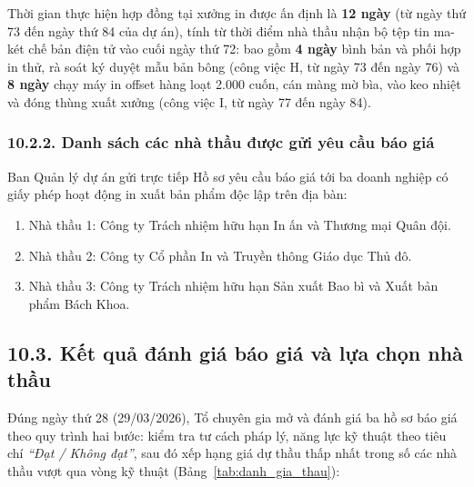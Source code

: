 Thời gian thực hiện hợp đồng tại xưởng in được ấn định là \textbf{12 ngày} (từ ngày thứ 73 đến ngày thứ 84 của dự án), tính từ thời điểm nhà thầu nhận bộ tệp tin ma-két chế bản điện tử vào cuối ngày thứ 72: bao gồm \textbf{4 ngày} bình bản và phối hợp in thử, rà soát ký duyệt mẫu bản bông (công việc H, từ ngày 73 đến ngày 76) và \textbf{8 ngày} chạy máy in offset hàng loạt 2.000 cuốn, cán màng mờ bìa, vào keo nhiệt và đóng thùng xuất xưởng (công việc I, từ ngày 77 đến ngày 84).

\subsubsection{10.2.2. Danh sách các nhà thầu được gửi yêu cầu báo giá}

Ban Quản lý dự án gửi trực tiếp Hồ sơ yêu cầu báo giá tới ba doanh nghiệp có giấy phép hoạt động in xuất bản phẩm độc lập trên địa bàn:
\begin{enumerate}
    \item Nhà thầu 1: Công ty Trách nhiệm hữu hạn In ấn và Thương mại Quân đội.
    \item Nhà thầu 2: Công ty Cổ phần In và Truyền thông Giáo dục Thủ đô.
    \item Nhà thầu 3: Công ty Trách nhiệm hữu hạn Sản xuất Bao bì và Xuất bản phẩm Bách Khoa.
\end{enumerate}

\subsection{10.3. Kết quả đánh giá báo giá và lựa chọn nhà thầu}

Đúng ngày thứ 28 (29/03/2026), Tổ chuyên gia mở và đánh giá ba hồ sơ báo giá theo quy trình hai bước: kiểm tra tư cách pháp lý, năng lực kỹ thuật theo tiêu chí \textit{``Đạt / Không đạt''}, sau đó xếp hạng giá dự thầu thấp nhất trong số các nhà thầu vượt qua vòng kỹ thuật (Bảng~\ref{tab:danh_gia_thau}):

